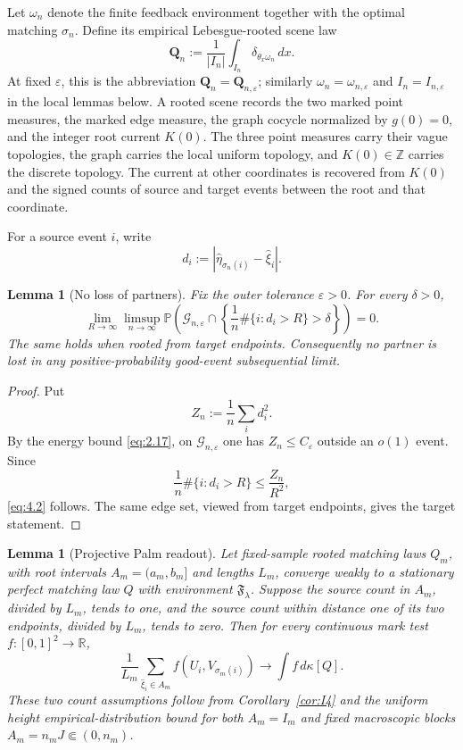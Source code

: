 \documentclass[11pt,reqno]{amsart}
\newtheorem{lemma}[theorem]{Lemma}
\theoremstyle{definition}
\theoremstyle{remark}
\numberwithin{equation}{section}
\newcommand{\R}{\mathbb R}
\newcommand{\Pp}{\mathbb P}
\newcommand{\cF}{\mathfrak F}
\begin{document}
Let \(\omega_n\) denote the finite feedback environment together with the
optimal matching \(\sigma_n\).  Define its empirical Lebesgue-rooted scene law
\begin{equation}
\mathbf Q_n
:=
\frac1{|I_n|}
\int_{I_n}\delta_{\theta_x\omega_n}\,dx.
\label{eq:4.1}
\end{equation}
At fixed \(\varepsilon\), this is the abbreviation
\(\mathbf Q_n=\mathbf Q_{n,\varepsilon}\); similarly
\(\omega_n=\omega_{n,\varepsilon}\) and \(I_n=I_{n,\varepsilon}\)
in the local lemmas below.
A rooted scene records the two marked point measures, the marked edge
measure, the graph cocycle normalized by \(g(0)=0\), and the integer
root current \(K(0)\). The three point measures carry their vague
topologies, the graph carries the local uniform topology, and
\(K(0)\in\mathbb Z\) carries the discrete topology. The current at
other coordinates is recovered from \(K(0)\) and the signed counts of
source and target events between the root and that coordinate.

For a source event \(i\), write
\[
d_i:=|\widehat\eta_{\sigma_n(i)}-\widehat\xi_i|.
\]

\begin{lemma}[No loss of partners]
\label{lem:no-loss}
Fix the outer tolerance \(\varepsilon>0\).  For every \(\delta>0\),
\begin{equation}
\lim_{R\to\infty}\limsup_{n\to\infty}
\Pp\left(
\mathcal G_{n,\varepsilon}\cap
\left\{\frac1n\#\{i:d_i>R\}>\delta\right\}
\right)=0.
\label{eq:4.2}
\end{equation}
The same holds when rooted from target endpoints.  Consequently no
partner is lost in any positive-probability good-event subsequential
limit.
\end{lemma}

\begin{proof}
Put
\[
Z_n:=\frac1n\sum_i d_i^2.
\]
By the energy bound \eqref{eq:2.17}, on \(\mathcal G_{n,\varepsilon}\) one has
\(Z_n\le C_\varepsilon\) outside an \(o(1)\) event.  Since
\[
\frac1n\#\{i:d_i>R\}\le\frac{Z_n}{R^2},
\]
\eqref{eq:4.2} follows.  The same edge set, viewed from target endpoints, gives
the target statement.
\end{proof}


\begin{lemma}[Projective Palm readout]
\label{lem:palm}
Let fixed-sample rooted matching laws \(Q_m\), with root intervals
\(A_m=(a_m,b_m]\) and lengths \(L_m\), converge weakly to a stationary
perfect matching law \(Q\) with environment \(\cF_\lambda\).
Suppose the source count in \(A_m\), divided by \(L_m\), tends to one,
and the source count within distance one of its two endpoints,
divided by \(L_m\), tends to zero.  Then for every continuous mark test
\(f:[0,1]^2\to\R\),
\begin{equation}
\frac1{L_m}\sum_{\widehat\xi_i\in A_m}
 f(U_i,V_{\sigma_m(i)})\longrightarrow\int f\,d\kappa[Q].
\label{eq:4.8}
\end{equation}
These two count assumptions follow from Corollary~\ref{cor:I4} and the uniform height
empirical-distribution bound for both \(A_m=I_m\) and fixed
macroscopic blocks \(A_m=n_mJ\Subset(0,n_m)\).
\end{lemma}
\end{document}
